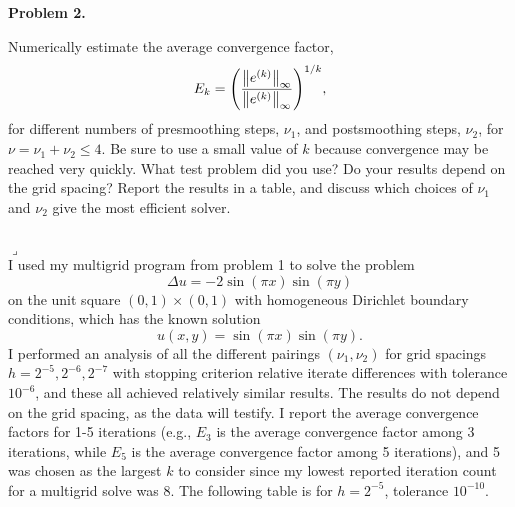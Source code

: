 \documentclass[12pt]{article}
\newenvironment{myprob}[1]
    {%
    \noindent{\Huge$\ulcorner$}\textbf{#1.}\begin{em}
    }
    { 
    \end{em} \\ \hphantom{l} \hfill {\Huge$\lrcorner$} }
\begin{document}
\begin{myprob}{Problem 2}
Numerically estimate the average convergence factor,
$$ E_k = \qty(\dfrac{\norm{e^{(k)}}_\infty}{\norm{e^{(k)}}_\infty})^{1/k},$$
for different numbers of presmoothing steps, $\nu_1$, and postsmoothing steps, $\nu_2$, for $\nu = \nu_1 + \nu_2 \leq 4$. Be sure to use a small value of $k$ because convergence may be reached very quickly. What test problem did you use? Do your results depend on the grid spacing? Report the results in a table, and discuss which choices of $\nu_1$ and $\nu_2$ give the most efficient solver. \\
\end{myprob} \\
I used my multigrid program from problem 1 to solve the problem
$$
\Delta u = -2 \sin(\pi x) \sin(\pi y)
$$
on the unit square $(0, 1)\times(0, 1)$ with homogeneous Dirichlet boundary conditions, which has the known solution $$u(x,y) = \sin(\pi x) \sin(\pi y).$$
I performed an analysis of all the different pairings $(\nu_1, \nu_2)$ for grid spacings $h=2^{-5}, 2^{-6}, 2^{-7}$ with stopping criterion relative iterate differences with tolerance $10^{-6}$, and these all achieved relatively similar results. The results do not depend on the grid spacing, as the data will testify. I report the average convergence factors for 1-5 iterations (e.g., $E_3$ is the average convergence factor among 3 iterations, while $E_5$ is the average convergence factor among 5 iterations), and 5 was chosen as the largest $k$ to consider since my lowest reported iteration count for a multigrid solve was 8.  
The following table is for $h=2^{-5}$, tolerance $10^{-10}$.\\
\end{document}
